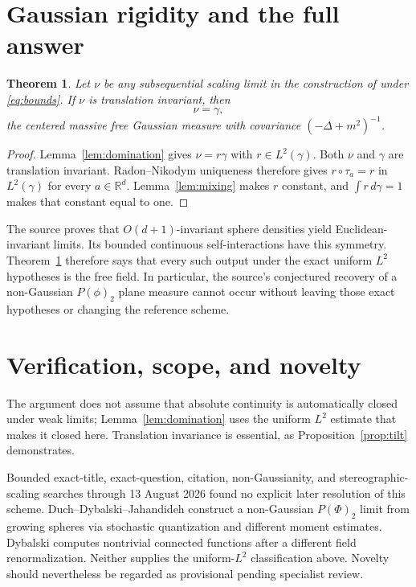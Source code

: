 \documentclass[11pt]{article}
\newtheorem{theorem}{Theorem}
\newcommand{\R}{\mathbb R}
\begin{document}
\section{Gaussian rigidity and the full answer}

\begin{theorem}\label{thm:main}
Let $\nu$ be any subsequential scaling limit in the construction of
\cite{source} under \eqref{eq:bounds}.  If $\nu$ is translation invariant,
then
\[
 \nu=\gamma,
\]
the centered massive free Gaussian measure with covariance
$(-\Delta+m^2)^{-1}$.
\end{theorem}

\begin{proof}
Lemma~\ref{lem:domination} gives $\nu=r\gamma$ with $r\in L^2(\gamma)$.
Both $\nu$ and $\gamma$ are translation invariant.  Radon--Nikodym uniqueness
therefore gives $r\circ\tau_a=r$ in $L^2(\gamma)$ for every $a\in\R^d$.
Lemma~\ref{lem:mixing} makes $r$ constant, and $\int r\,d\gamma=1$ makes that
constant equal to one.
\end{proof}

The source proves that $O(d+1)$-invariant sphere densities yield
Euclidean-invariant limits.  Its bounded continuous self-interactions have
this symmetry.  Theorem~\ref{thm:main} therefore says that every such output
under the exact uniform $L^2$ hypotheses is the free field.  In particular,
the source's conjectured recovery of a non-Gaussian $P(\phi)_2$ plane measure
cannot occur without leaving those exact hypotheses or changing the reference
scheme.

\section{Verification, scope, and novelty}

The argument does not assume that absolute continuity is automatically
closed under weak limits; Lemma~\ref{lem:domination} uses the uniform $L^2$
estimate that makes it closed here.  Translation invariance is essential, as
Proposition~\ref{prop:tilt} demonstrates.

Bounded exact-title, exact-question, citation, non-Gaussianity, and
stereographic-scaling searches through 13 August 2026 found no explicit later
resolution of this scheme.  Duch--Dybalski--Jahandideh \cite{ddj} construct a
non-Gaussian $P(\Phi)_2$ limit from growing spheres via stochastic
quantization and different moment estimates.  Dybalski \cite{dybalski}
computes nontrivial connected functions after a different field
renormalization.  Neither supplies the uniform-$L^2$ classification above.
Novelty should nevertheless be regarded as provisional pending specialist
review.
\end{document}
